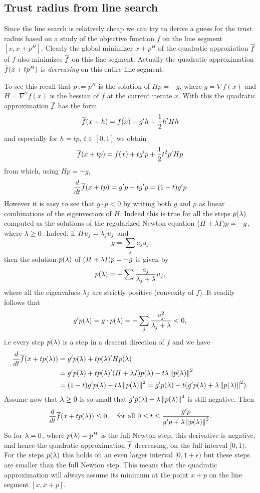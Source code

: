 \subsection{Trust radius from line search}
\label{sec:line_search_trust_radius}

Since the line search is relatively cheap we can try to derive a guess for the trust radius based on a study of the 
objective function $f$ on the line segment $[x,x+p^H]$. Clearly the global minimizer $x+p^H$ of the quadratic approxiation
$\overline f$ of $f$ also minimizes $\overline f$ on this line segment. Actually the quadratic approximation $\overline f(x+tp^H)$ is \textit{decreasing}
on this entire line segment.

To see this recall that $p:=p^H$ is the solution of $Hp=-g$, where $g=\nabla f(x)$ and $H=\nabla^2f(x)$ is the hessian of $f$ at the current
iterate $x$. With this the quadratic approximation $\overline f$ has the form
$$
\overline f(x+h)=f(x)+g'h+\frac{1}{2}h'Hh
$$
and especially for $h=tp$, $t\in[0,1]$ we obtain
$$
\overline f(x+tp)=f(x)+tg'p+\frac{1}{2}t^2p'Hp
$$
from which, using $Hp=-g$,
$$
\frac{d}{dt}\overline f(x+tp)=g'p-tg'p=(1-t)g'p
$$
However it is easy to see that $g\cdot p<0$ by writing both $g$ and $p$ as linear combinations of the eigenvectors of $H$.
Indeed this is true for all the steps $p(\lambda)$ computed as the solutions of the regularized Newton equation $(H+\lambda I)p=-g$,
where $\lambda\geq 0$. Indeed, if $Hu_j=\lambda_ju_j$ and 
$$
g=\sum_ja_ju_j
$$ 
then the solution $p(\lambda)$ of $(H+\lambda I)p=-g$ is given by
$$
p(\lambda)=-\sum\frac{a_j}{\lambda_j+\lambda}u_j,
$$
where all the eigenvalues $\lambda_j$ are strictly positive (convexity of $f$).  It readily follows that
$$
g'p(\lambda)=g\cdot p(\lambda)=-\sum_j\frac{a_j^2}{\lambda_j+\lambda}<0,
$$
i.e every step $p(\lambda)$ is a step in a descent direction of $f$ and we have
%
\begin{align*}
\frac{d}{dt}\overline f(x+tp(\lambda))&=
g'p(\lambda)+tp(\lambda)'Hp(\lambda)\\&=
g'p(\lambda)+tp(\lambda)'(H+\lambda I)p(\lambda)-t\lambda\left\|p(\lambda)\right\|^2\\&=
(1-t)g'p(\lambda)-t\lambda\left\|p(\lambda)\right\|^2=
g'p(\lambda)-t(g'p(\lambda)+\lambda\left\|p(\lambda)\right\|^2).
\end{align*}
%
Assume now that $\lambda\geq 0$ is so small that $g'p(\lambda)+\lambda\left\|p(\lambda)\right\|^2$ is still negative. Then 
%
\begin{equation}
\label{line_decrease}
\frac{d}{dt}\overline f(x+tp(\lambda))\leq 0,\quad\text{for all }0\leq t\leq\frac{g'p}{g'p+\lambda\left\|p(\lambda)\right\|^2}.
\end{equation}
%
So for $\lambda=0$, where $p(\lambda)=p^H$ is the full Newton step, this derivative is negative, and hence the 
quadratic approximation $\overline f$ decreasing, on the full interval $[0,1)$. For the steps $p(\lambda)$
this holds on an even larger interval $[0,1+\epsilon)$ but these steps are smaller than the full Newton step.
This means that the quadratic approximation will always assume its minimum at the point $x+p$ on the line segment
$[x,x+p]$.

